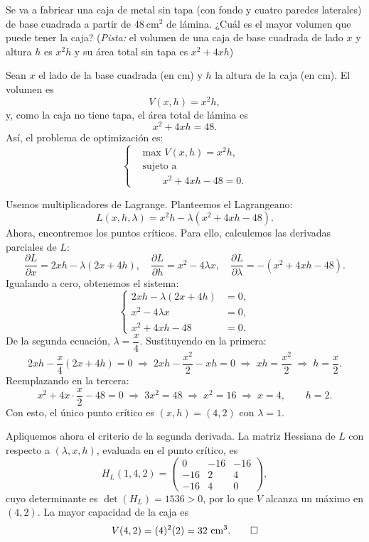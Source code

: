 \documentclass[10pt,a5]{aleph-examen}
\begin{document}
\begin{preguntas}
\item
Se va a fabricar una caja de metal sin tapa (con fondo y cuatro paredes laterales) de base cuadrada a partir de $48\ \text{cm}^2$ de lámina. ¿Cuál es el mayor volumen que puede tener la caja? {\footnotesize(\noindent\textit{Pista:} el volumen de una caja de base cuadrada de lado $x$ y altura $h$ es $x^2h$ y su área total sin tapa es $x^2 + 4xh$)}

\begin{respuesta}
Sean $x$ el lado de la base cuadrada (en cm) y $h$ la altura de la caja (en cm). El volumen es
\[
    V(x,h) = x^2 h,
\]
y, como la caja no tiene tapa, el área total de lámina es
\[
    x^2 + 4xh = 48.
\]
Así, el problema de optimización es:
\[
    \left\{
    \begin{aligned}
        &\text{max } V(x,h) = x^2 h,\\
        &\text{sujeto a} \\
        &\qquad x^2 + 4xh - 48 = 0.
    \end{aligned}
    \right.
\]

Usemos multiplicadores de Lagrange. Planteemos el Lagrangeano:
\[
    L(x,h,\lambda) = x^2 h - \lambda(x^2 + 4xh - 48).
\]
Ahora, encontremos los puntos críticos. Para ello, calculemos las derivadas parciales de $L$:
\[
    \frac{\partial L}{\partial x} = 2xh - \lambda(2x + 4h),\quad
    \frac{\partial L}{\partial h} = x^2 - 4\lambda x,\quad
    \frac{\partial L}{\partial \lambda} = -(x^2 + 4xh - 48).
\]
Igualando a cero, obtenemos el sistema:
\[
    \left\{
    \begin{aligned}
        2xh - \lambda(2x + 4h) &= 0,\\
        x^2 - 4\lambda x &= 0,\\
        x^2 + 4xh - 48 &= 0.
    \end{aligned}
    \right.
\]
De la segunda ecuación, $\lambda = \dfrac{x}{4}$. Sustituyendo en la primera:
\[
    2xh - \frac{x}{4}(2x + 4h) = 0
    \;\Longrightarrow\;
    2xh - \frac{x^2}{2} - xh = 0
    \;\Longrightarrow\;
    xh = \frac{x^2}{2}
    \;\Longrightarrow\;
    h = \frac{x}{2}.
\]
Reemplazando en la tercera:
\[
    x^2 + 4x\cdot\frac{x}{2} - 48 = 0
    \;\Longrightarrow\;
    3x^2 = 48
    \;\Longrightarrow\;
    x^2 = 16
    \;\Longrightarrow\;
    x = 4,\qquad h = 2.
\]
Con esto, el único punto crítico es $(x,h) = (4,2)$ con $\lambda = 1$.

Apliquemos ahora el criterio de la segunda derivada. La matriz Hessiana de $L$ con respecto a $(\lambda,x,h)$, evaluada en el punto crítico, es
\[
    H_L\!\left(1,4,2\right)
    =
    \begin{pmatrix}
        0 & -16 & -16\\[4pt]
        -16 & 2 & 4\\[4pt]
        -16 & 4 & 0
    \end{pmatrix},
\]
cuyo determinante es $\det(H_L) = 1536 > 0$, por lo que $V$ alcanza un {máximo} en $(4,2)$. La mayor capacidad de la caja es
\[
    V(4,2) = (4)^2(2) = 32\ \text{cm}^3.\qedhere
\]
\end{respuesta}

\end{preguntas}
\end{document}
